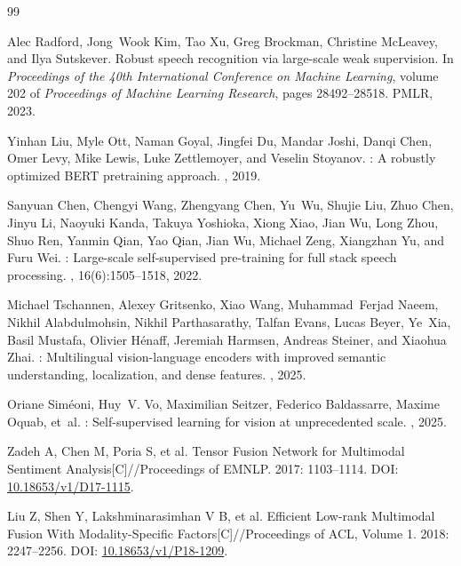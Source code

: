{
\begin{thebibliography}{99}

Alec Radford, Jong~Wook Kim, Tao Xu, Greg Brockman, Christine McLeavey, and
  Ilya Sutskever.
\newblock Robust speech recognition via large-scale weak supervision.
\newblock In {\em Proceedings of the 40th International Conference on Machine
  Learning}, volume 202 of {\em Proceedings of Machine Learning Research},
  pages 28492--28518. PMLR, 2023.

Yinhan Liu, Myle Ott, Naman Goyal, Jingfei Du, Mandar Joshi, Danqi Chen, Omer
  Levy, Mike Lewis, Luke Zettlemoyer, and Veselin Stoyanov.
: A robustly optimized {BERT} pretraining approach.
, 2019.

Sanyuan Chen, Chengyi Wang, Zhengyang Chen, Yu~Wu, Shujie Liu, Zhuo Chen, Jinyu
  Li, Naoyuki Kanda, Takuya Yoshioka, Xiong Xiao, Jian Wu, Long Zhou, Shuo Ren,
  Yanmin Qian, Yao Qian, Jian Wu, Michael Zeng, Xiangzhan Yu, and Furu Wei.
: Large-scale self-supervised pre-training for full stack
  speech processing.
,
  16(6):1505--1518, 2022.

Michael Tschannen, Alexey Gritsenko, Xiao Wang, Muhammad~Ferjad Naeem, Nikhil
  Alabdulmohsin, Nikhil Parthasarathy, Talfan Evans, Lucas Beyer, Ye~Xia, Basil
  Mustafa, Olivier H{\'e}naff, Jeremiah Harmsen, Andreas Steiner, and Xiaohua
  Zhai.
: Multilingual vision-language encoders with improved
  semantic understanding, localization, and dense features.
, 2025.

Oriane Sim{\'e}oni, Huy~V. Vo, Maximilian Seitzer, Federico Baldassarre, Maxime
  Oquab, et~al.
: Self-supervised learning for vision at unprecedented scale.
, 2025.

 Zadeh A, Chen M, Poria S, et al. Tensor Fusion Network for Multimodal Sentiment Analysis[C]//Proceedings of EMNLP. 2017: 1103--1114. DOI: \url{10.18653/v1/D17-1115}.

 Liu Z, Shen Y, Lakshminarasimhan V B, et al. Efficient Low-rank Multimodal Fusion With Modality-Specific Factors[C]//Proceedings of ACL, Volume 1. 2018: 2247--2256. DOI: \url{10.18653/v1/P18-1209}.


\end{thebibliography}}
